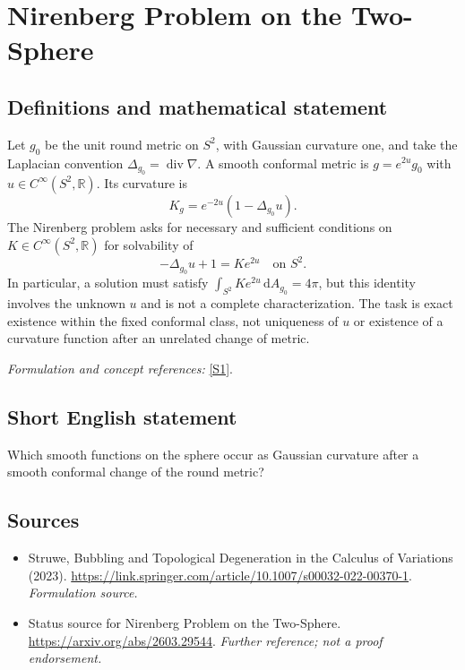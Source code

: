 \documentclass[11pt]{article}
\begin{document}
\section*{\texorpdfstring{Nirenberg Problem on the Two-Sphere}{Nirenberg Problem on the Two-Sphere}}\label{30006862}
\subsection{Definitions and mathematical statement}
Let $g_0$ be the unit round metric on $S^2$, with Gaussian curvature one, and take the Laplacian convention $\Delta_{g_0}=\operatorname{div}\nabla$. A smooth conformal metric is $g=e^{2u}g_0$ with $u\in C^\infty(S^2,{\mathbb{R}})$. Its curvature is
\[
 K_g=e^{-2u}(1-\Delta_{g_0}u).
\]
The Nirenberg problem asks for necessary and sufficient conditions on $K\in C^\infty(S^2,{\mathbb{R}})$ for solvability of
\[
 -\Delta_{g_0}u+1=K e^{2u}\quad\text{on }S^2.
\]
In particular, a solution must satisfy $\int_{S^2}K e^{2u}{\,\mathrm{d}} A_{g_0}=4\pi$, but this identity involves the unknown $u$ and is not a complete characterization. The task is exact existence within the fixed conformal class, not uniqueness of $u$ or existence of a curvature function after an unrelated change of metric.
\par\smallskip\textit{Formulation and concept references:} \href{https://link.springer.com/article/10.1007/s00032-022-00370-1}{[S1]}.

\subsection{Short English statement}
Which smooth functions on the sphere occur as Gaussian curvature after a smooth conformal change of the round metric?
\subsection{Sources}
\begin{itemize}
\item[S1]Struwe, Bubbling and Topological Degeneration in the Calculus of Variations (2023).
\url{https://link.springer.com/article/10.1007/s00032-022-00370-1}.
\textit{Formulation source.}
\item[S2]Status source for Nirenberg Problem on the Two-Sphere.
\url{https://arxiv.org/abs/2603.29544}.
\textit{Further reference; not a proof endorsement.}
\end{itemize}
\end{document}
